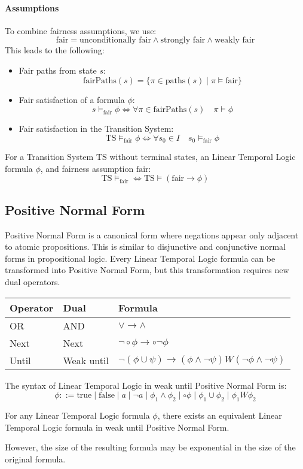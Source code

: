 \paragraph*{Assumptions}
To combine fairness assumptions, we use:
\[\text{fair}=\text{unconditionally fair}\land\text{strongly fair}\land\text{weakly fair}\]
\noindent This leads to the following:
\begin{itemize}
    \item Fair paths from state $s$: 
        \[\text{fairPaths}(s)=\{\pi\in\text{paths}(s)\mid\pi\models\text{fair}\}\]
    \item Fair satisfaction of a formula $\phi$: 
        \[s\models_{\text{fair}}\phi\Leftrightarrow\forall\pi\in\text{fairPaths}(s)\quad\pi\models\phi\]
    \item Fair satisfaction in the Transition System: 
        \[\text{TS}\models_{\text{fair}}\phi\Leftrightarrow\forall s_0\in I\quad s_0\models_{\text{fair}}\phi\]
\end{itemize}
\begin{theorem}
    For a Transition System $\text{TS}$ without terminal states, an Linear Temporal Logic formula $\phi$, and fairness assumption $\text{fair}$: 
    \[\text{TS}\models_{\text{fair}}\Leftrightarrow\text{TS}\models(\text{fair}\rightarrow\phi)\]
\end{theorem}

\subsection{Positive Normal Form}
Positive Normal Form is a canonical form where negations appear only adjacent to atomic propositions. 
This is similar to disjunctive and conjunctive normal forms in propositional logic.
Every Linear Temporal Logic formula can be transformed into Positive Normal Form, but this transformation requires new dual operators.
\begin{table}[H]
    \centering
    \begin{tabular}{|l|l|l|}
    \hline
    \textbf{Operator} & \textbf{Dual} & \textbf{Formula} \\ \hline
    OR                & AND           & $\lor\rightarrow\land$                \\ \hline
    Next              & Next          & $\lnot\circ\phi\rightarrow\circ\lnot\phi$                 \\ \hline
    Until             & Weak until    & $\lnot(\phi\cup\psi)\rightarrow(\phi\land\lnot\psi)W(\lnot\phi\land\lnot\psi)$                \\ \hline
    \end{tabular}
\end{table}
The syntax of Linear Temporal Logic in weak until Positive Normal Form is:
\[\phi::=\text{true}\mid\text{false}\mid a \mid\lnot a\mid \phi_1\land\phi_2\mid\circ\phi\mid\phi_1\cup\phi_2\mid\phi_1 W\phi_2\]
\begin{theorem}
    For any Linear Temporal Logic formula $\phi$, there exists an equivalent Linear Temporal Logic formula in weak until Positive Normal Form. 
\end{theorem}
\noindent However, the size of the resulting formula may be exponential in the size of the original formula.

